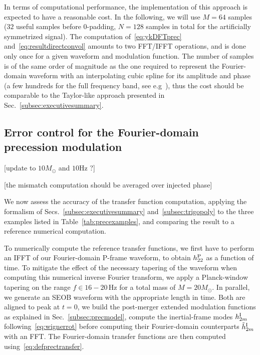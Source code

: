 \documentclass[aps,showpacs,twocolumn,
prd,superscriptaddress,nofootinbib]{revtex4-1}
\newcommand{\Hz}{\,\mathrm{Hz}}
\newcommand{\Msol}{M_{\odot}}
\newcommand{\SM}[1]{{\color{Red} #1}}
\begin{document}
In terms of computational performance, the implementation of this approach is expected to have a reasonable cost. In the following, we will use $M=64$ samples ($32$ useful samples before 0-padding, $N=128$ samples in total for the artificially symmetrized signal). The computation of~\eqref{eq:ykDFTprec} and~\eqref{eq:resultdirectconvol} amounts to two FFT/IFFT operations, and is done only once for a given waveform and modulation function. The number of samples is of the same order of magnitude as the one required to represent the Fourier-domain waveform with an interpolating cubic spline for its amplitude and phase (a few hundreds for the full frequency band, see e.g~\cite{Puerrer14}), thus the cost should be comparable to the Taylor-like approach presented in Sec.~\ref{subsec:executivesummary}.


\subsection{Error control for the Fourier-domain precession modulation}
\label{subsec:precerror}

\SM{[update to $10 M_{\odot}$ and $10\mathrm{Hz}$ ?]}

\SM{[the mismatch computation should be averaged over injected phase]}

We now assess the accuracy of the transfer function computation, applying the formalism of Secs.~\ref{subsec:executivesummary} and~\ref{subsec:trigopoly} to the three examples listed in Table~\ref{tab:precexamples}, and comparing the result to a reference numerical computation.

To numerically compute the reference transfer functions, we first have to perform an IFFT of our Fourier-domain P-frame waveform, to obtain $h^{\rm P}_{22}$ as a function of time. To mitigate the effect of the necessary tapering of the waveform when computing this numerical inverse Fourier transform, we apply a Planck-window tapering on the range $f\in 16-20 \Hz$ for a total mass of $M=20 \Msol$. In parallel, we generate an SEOB waveform with the appropriate length in time. Both are aligned to peak at $t=0$, we build the post-merger extended modulation functions as explained in Sec.~\ref{subsec:precmodel}, compute the inertial-frame modes $h^{\rm I}_{2m}$ following~\eqref{eq:wignerrot} before computing their Fourier-domain counterparts $\tilde{h}^{\rm I}_{2m}$ with an FFT. The Fourier-domain transfer functions are then computed using~\eqref{eq:defprectransfer}.
\end{document}
